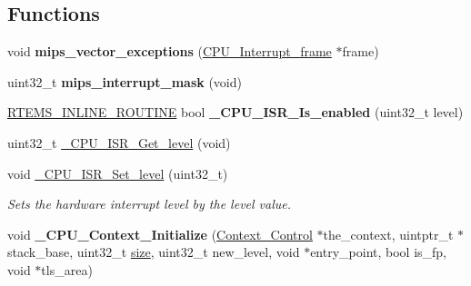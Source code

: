 \subsection*{Functions}
\begin{DoxyCompactItemize}
\item 
\mbox{\label{group__RTEMSScoreCPUMIPS_gaaac8f5b5ccd47946450adb4e4205d830}} 
void {\bfseries mips\+\_\+vector\+\_\+exceptions} (\mbox{\hyperlink{structCPU__Interrupt__frame}{C\+P\+U\+\_\+\+Interrupt\+\_\+frame}} $\ast$frame)
\item 
\mbox{\label{group__RTEMSScoreCPUMIPS_gaaf0518ae2fb7c32b27af5043b966b670}} 
uint32\+\_\+t {\bfseries mips\+\_\+interrupt\+\_\+mask} (void)
\item 
\mbox{\label{group__RTEMSScoreCPUMIPS_ga5254669b54a06e96ebb585fd50a02c4d}} 
\mbox{\hyperlink{group__RTEMSScoreBaseDefs_gac216239df231d5dbd15e3520b0b9313f}{R\+T\+E\+M\+S\+\_\+\+I\+N\+L\+I\+N\+E\+\_\+\+R\+O\+U\+T\+I\+NE}} bool {\bfseries \+\_\+\+C\+P\+U\+\_\+\+I\+S\+R\+\_\+\+Is\+\_\+enabled} (uint32\+\_\+t level)
\item 
uint32\+\_\+t \mbox{\hyperlink{group__RTEMSScoreCPUMIPS_ga1d9dcab9170d532b6634a5620385adbd}{\+\_\+\+C\+P\+U\+\_\+\+I\+S\+R\+\_\+\+Get\+\_\+level}} (void)
\item 
void \mbox{\hyperlink{group__RTEMSScoreCPUMIPS_ga912ddf7e114fd008ceb824da3423ce74}{\+\_\+\+C\+P\+U\+\_\+\+I\+S\+R\+\_\+\+Set\+\_\+level}} (uint32\+\_\+t)
\begin{DoxyCompactList}\small\item\em Sets the hardware interrupt level by the level value. \end{DoxyCompactList}\item 
\mbox{\label{group__RTEMSScoreCPUMIPS_ga6c257fd8b04820e61c562950280f1d38}} 
void {\bfseries \+\_\+\+C\+P\+U\+\_\+\+Context\+\_\+\+Initialize} (\mbox{\hyperlink{structContext__Control}{Context\+\_\+\+Control}} $\ast$the\+\_\+context, uintptr\+\_\+t $\ast$stack\+\_\+base, uint32\+\_\+t \mbox{\hyperlink{sun4u_2tte_8h_a245260f6f74972558f61b85227df5aae}{size}}, uint32\+\_\+t new\+\_\+level, void $\ast$entry\+\_\+point, bool is\+\_\+fp, void $\ast$tls\+\_\+area)
\item 
\mbox{\label{group__RTEMSScoreCPUMIPS_ga69fbfde2b5bb97c9eb838e0c3f5653f7}} 

\end{DoxyCompactItemize}

